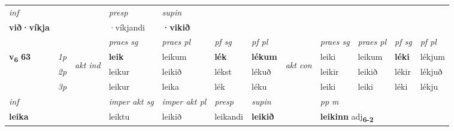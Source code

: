 \begin{longtable}[l]{X>{\footnotesize\itshape}llXXXXlXXXX}
\cmidrule{4-7}
   {\textit{inf}} & &     & \textit{presp} & \textit{supin}   \\*
  {\textbf{við\allowbreak ·víkja}} & &     & ·víkjandi &  \textbf{·vikið}   \\*

\midrule

 & &   & \textit{praes sg}  & \textit{praes pl}    & \textit{ pf sg} & \textit{pf pl} & & \textit{praes sg}  & \textit{praes pl}    & \textit{pf sg} & \textit{pf pl }  \\ \cmidrule{4-7} \cmidrule{9-12}
 \multirow{2}{*}{{{\textbf{v{\textsubscript{6}}} \Large{\textbf{63}}}}}  & 1p & \multirow{3}{*}{\begin{turn}{90}\textit{akt ind}\end{turn}} & \textbf{leik} & leikum & \textbf{lék} & \textbf{lékum} & \multirow{3}{*}{\begin{turn}{90}\textit{akt con}\end{turn}} &leiki & leikum & \textbf{léki} & lékjum\\*
 & 2p &  &  leikur  & leikið & lékst & lékuð & & leikir & leikið & lékir & lékjuð \\*
 & 3p &  & leikur & leika & lék & léku & & leiki & leiki& léki & lékju \\*
\cmidrule{4-7} \cmidrule{9-12}

   {\textit{inf}} & &  & \textit{imper akt sg} & \textit{imper akt pl}   & \textit{presp} & \textit{supin}  && \textit{pp m} \\*
  {\textbf{leika}} & && leiktu  & leikið   & leikandi &  \textbf{leikið}  && \multicolumn{2}{l}{\textbf{leikinn} adj\textbf{\textsubscript{6-2}}} \\*

\midrule


\end{longtable}
